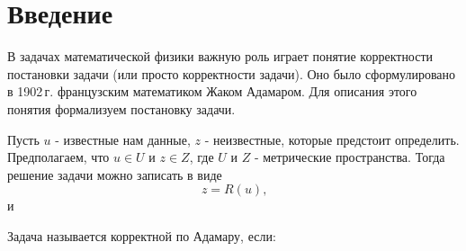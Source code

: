 \newpage
\section{Введение}



В задачах математической физики важную роль играет понятие корректности постановки задачи (или просто корректности задачи). Оно было сформулировано в 1902\,г. французским математиком Жаком Адамаром. Для описания этого понятия формализуем постановку задачи.

Пусть $u$ - известные нам данные, $z$ - неизвестные, которые предстоит определить. Предполагаем, что $u \in U$ и $z \in Z$, где $U$ и $Z$ - метрические пространства. Тогда решение задачи можно записать в виде
\[
z = R(u) \text{,}
\]
и 


Задача называется корректной по Адамару, если:

